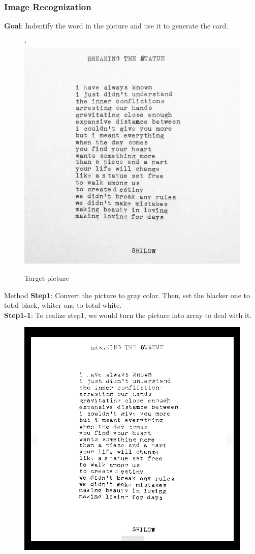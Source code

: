 \documentclass{beamer}
\begin{document}
\frame{\titlepage} 

\begin{frame}
	\frametitle{Image Recognization}
	\textbf{Goal}: Indentify the word in the picture and use it to generate the card.
	\begin{figure}[h]`
		\centering
		\includegraphics[width=0.55\linewidth]{./img1.jpg}
		\caption{Target picture}
	\end{figure}
\end{frame}

\begin{frame}{Method}
		\textbf{Step1}: Convert the picture to gray color. Then, set the blacker one to total black, whiter one to total white.\\
		\textbf{Step1-1}: To realize step1, we would turn the picture into array to deal with it.
		\begin{figure}[h]
			\centering
			\includegraphics[width=0.50\linewidth]{./picture_blackwhite.png}
		\end{figure}
\end{frame}
\end{document}
